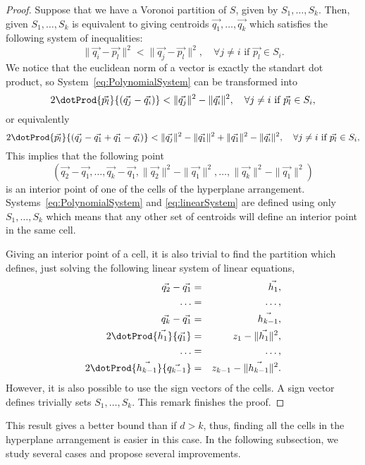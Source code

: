 \begin{proof}
  Suppose that we have a Voronoi partition of $S$, given by $S_1,\ldots, S_k$.
  Then, given $S_1,\ldots, S_k$ is equivalent to giving centroids $\vec{q_1},\ldots,\vec{q_k}$
  which satisfies the following system of inequalities:
  \begin{equation}
    \label{eq:PolynomialSystem}
    \|\vec{q_i}-\vec{p_l}\|^2<\|\vec{q_j}-\vec{p_l}\|^2,\quad \forall j\neq i\text{ if }\vec{p_l}\in S_i.
  \end{equation}
  We notice that the euclidean norm of a vector is exactly the standart dot product, so System~\eqref{eq:PolynomialSystem}
  can be transformed into
  \begin{equation*}
    2\dotProd{\vec{p_l}}{(\vec{q_j}-\vec{q_i})}< \|\vec{q_j}\|^2-\|\vec{q_i}\|^2,\quad \forall j\neq i\text{ if }\vec{p_l}\in S_i, 
  \end{equation*}
  or equivalently
 \begin{equation}
   \label{eq:linearSystem}
    2\dotProd{\vec{p_l}}{(\vec{q_j}-\vec{q_1}+\vec{q_1}-\vec{q_i})}< \|\vec{q_j}\|^2-\|\vec{q_1}\|^2+\|\vec{q_1}\|^2-\|\vec{q_i}\|^2,
    \quad \forall j\neq i\text{ if }\vec{p_l}\in S_i, 
  \end{equation}
  This implies that the following point 
  $$
  (\vec{q_2}-\vec{q_1},\ldots,\vec{q_k}-\vec{q_1},\|\vec{q_2}\|^2-\|\vec{q_1}\|^2,\ldots, \|\vec{q_k}\|^2-\|\vec{q_1}\|^2)
  $$
  is an interior point of one of the cells of the hyperplane arrangement. Systems~\eqref{eq:PolynomialSystem} and \eqref{eq:linearSystem}
  are defined using only $S_1,\ldots, S_k$ which means that any other set of centroids will define an interior point in the same cell.

  Giving an interior point of a cell, it is also trivial to find the partition which defines, just solving the following 
  linear system of linear equations,
  \begin{eqnarray*}
    \vec{q_2}-\vec{q_1}&=&\vec{h_1},\\
    \ldots &=&\ldots,\\
    \vec{q_k}-\vec{q_1}&=&\vec{h_{k-1}},\\
    2\dotProd{\vec{h_1}}{\vec{q_1}}&=&z_1-\|\vec{h_1}\|^2,\\
    \ldots &=&\ldots,\\
    2\dotProd{\vec{h_{k-1}}}{\vec{q_{k-1}}}&=&z_{k-1}-\|\vec{h_{k-1}}\|^2.\\
  \end{eqnarray*}
  However, it is also possible to use the sign vectors of the cells. A sign vector 
  defines trivially  sets $S_1,\ldots, S_k$.
  This remark finishes the proof.
\end{proof}
This result gives a better bound than \cite[Theorem 3]{InabaKatohImai} if $d>k$, thus, finding 
all the cells in the hyperplane arrangement is easier in this case. 
In the following subsection, we study several cases and propose several improvements.


